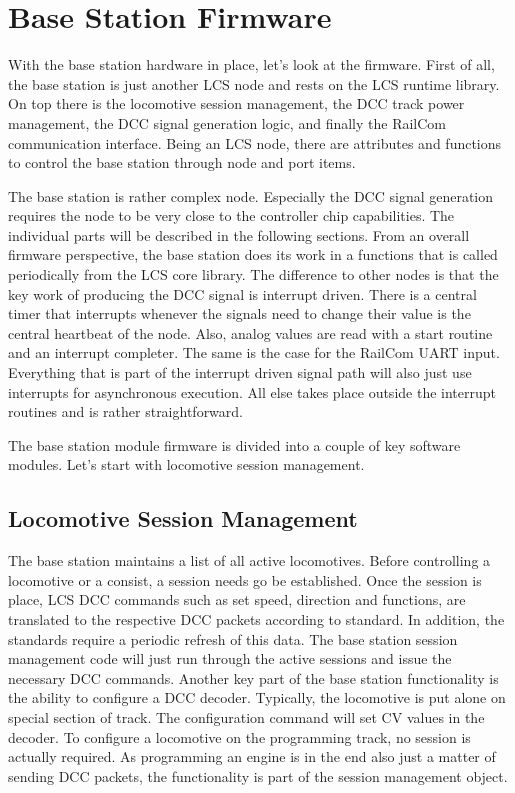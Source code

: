 \section{Base Station Firmware}

With the base station hardware in place, let's look at the firmware. First of all, the base station is just another LCS node and rests on the LCS runtime library. On top there is the locomotive session management, the DCC track power management, the DCC signal generation logic, and finally the RailCom communication interface. Being an LCS node, there are attributes and functions to control the base station through node and port items.

The base station is rather complex node. Especially the DCC signal generation requires the node to be very close to the controller chip capabilities. The individual parts will be described in the following sections. From an overall firmware perspective, the base station does its work in a functions that is called periodically from the LCS core library. The difference to other nodes is that the key work of producing the DCC signal is interrupt driven. There is a central timer that interrupts whenever the signals need to change their value is the central heartbeat of the node. Also, analog values are read with a start routine and an interrupt completer. The same is the case for the RailCom UART input. Everything that is part of the interrupt driven signal path will also just use interrupts for asynchronous execution. All else takes place outside the interrupt routines and is rather straightforward.

The base station module firmware is divided into a couple of key software modules. Let's start with locomotive session management.

\subsection{Locomotive Session Management}

The base station maintains a list of all active locomotives. Before controlling a locomotive or a consist, a session needs go be established. Once the session is place, LCS DCC commands such as set speed, direction and functions, are translated to the respective DCC packets according to standard. In addition, the standards require a periodic refresh of this data. The base station session management code will just run through the active sessions and issue the necessary DCC commands. Another key part of the base station functionality is the ability to configure a DCC decoder. Typically, the locomotive is put alone on special section of track. The configuration command will set CV values in the decoder. To configure a locomotive on the programming track, no session is actually required. As programming an engine is in the end also just a matter of sending DCC packets, the functionality is part of the session management object.

